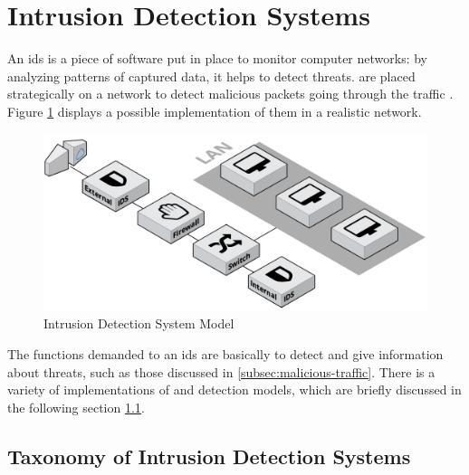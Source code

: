 
\section{Intrusion Detection Systems}
\label{sec:intrusion-detection-system}

An \gls{ids} is a piece of software put in place to monitor computer networks: by analyzing patterns of captured data, it helps to detect threats.  are placed strategically on a network to detect malicious packets going through the traffic \cite{Hodo2017}. Figure \ref{fig:IDS-model} displays a possible implementation of them in a realistic network.

\begin{figure}[h!]
        \centering
        \includegraphics[scale=0.24]{assets/figures/chapter2/Intrusion Detection System Model.png}
        \caption{Intrusion Detection System Model}
        \label{fig:IDS-model}
\end{figure}
\noindent The functions demanded to an \gls{ids} are basically to detect and give information about threats, such as those discussed in \ref{subsec:malicious-traffic}. There is a variety of implementations of  and detection models, which are briefly discussed in the following section \ref{subsec:taxonomy-ids}.



\subsection{Taxonomy of Intrusion Detection Systems}
\label{subsec:taxonomy-ids}

